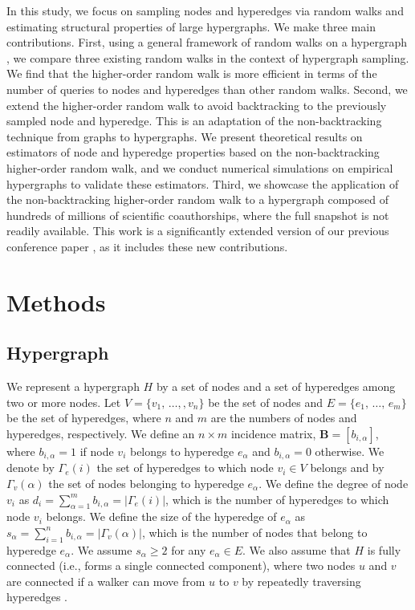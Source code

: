 In this study, we focus on sampling nodes and hyperedges via random walks and estimating structural properties of large hypergraphs. 
We make three main contributions. 
First, using a general framework of random walks on a hypergraph \cite{zhou2006, hayashi2020}, we compare three existing random walks in the context of hypergraph sampling. 
We find that the higher-order random walk \cite{banerjee2021, luo2024, traversa2024} is more efficient in terms of the number of queries to nodes and hyperedges than other random walks. 
Second, we extend the higher-order random walk to avoid backtracking to the previously sampled node and hyperedge. 
This is an adaptation of the non-backtracking technique \cite{lee2012, li2015} from graphs to hypergraphs. 
We present theoretical results on estimators of node and hyperedge properties based on the non-backtracking higher-order random walk, and we conduct numerical simulations on empirical hypergraphs to validate these estimators. 
Third, we showcase the application of the non-backtracking higher-order random walk to a hypergraph composed of hundreds of millions of scientific coauthorships, where the full snapshot is not readily available. 
This work is a significantly extended version of our previous conference paper \cite{kodakari2025}, as it includes these new contributions.

\section{Methods} \label{section:2}

\subsection{Hypergraph} \label{section:2.1}

We represent a hypergraph $H$ by a set of nodes and a set of hyperedges among two or more nodes.
Let $V=\{v_1, \,\dots, , v_n\}$ be the set of nodes and $E=\{e_1,\,\dots,\,e_m\}$ be the set of hyperedges, where $n$ and $m$ are the numbers of nodes and hyperedges, respectively.
We define an $n \times m$ incidence matrix, $\bm{B} = [b_{i,\alpha}]$, where $b_{i,\alpha} = 1$ if node $v_i$ belongs to hyperedge $e_\alpha$ and $b_{i,\alpha} = 0$ otherwise.
We denote by $\Gamma_e(i)$ the set of hyperedges to which node $v_i \in V$ belongs and by $\Gamma_v(\alpha)$ the set of nodes belonging to hyperedge $e_{\alpha}$.
We define the degree of node $v_i$ as $d_i = \sum_{\alpha=1}^m b_{i, \alpha} = |\Gamma_e(i)|$, which is the number of hyperedges to which node $v_i$ belongs.
We define the size of the hyperedge of $e_{\alpha}$ as $s_{\alpha} = \sum_{i=1}^n b_{i, \alpha} = |\Gamma_v(\alpha)|$, which is the number of nodes that belong to hyperedge $e_{\alpha}$.
We assume $s_{\alpha} \geq 2$ for any $e_\alpha \in E$.
We also assume that $H$ is fully connected (i.e., forms a single connected component), where two nodes $u$ and $v$ are connected if a walker can move from $u$ to $v$ by repeatedly traversing hyperedges \cite{zhou2006}.

